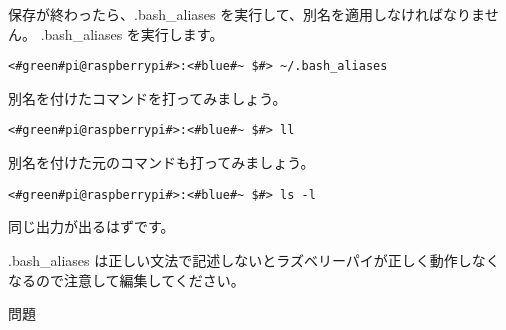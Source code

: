 保存が終わったら、.bash{\_}aliases を実行して、別名を適用しなければなりません。
.bash{\_}aliases を実行します。
\begin{lstlisting}[caption=.bashaliasesを実行, label=executeBashAliases]
    <#green#pi@raspberrypi#>:<#blue#~ $#> ~/.bash_aliases
\end{lstlisting}

別名を付けたコマンドを打ってみましょう。
\begin{lstlisting}[caption=別名の確認, label=confirmAlias]
    <#green#pi@raspberrypi#>:<#blue#~ $#> ll
\end{lstlisting}

別名を付けた元のコマンドも打ってみましょう。
\begin{lstlisting}[caption=元のコマンドの確認, label=confirmCommand]
    <#green#pi@raspberrypi#>:<#blue#~ $#> ls -l
\end{lstlisting}

同じ出力が出るはずです。

.bash{\_}aliases は正しい文法で記述しないとラズベリーパイが正しく動作しなくなるので注意して編集してください。

問題
